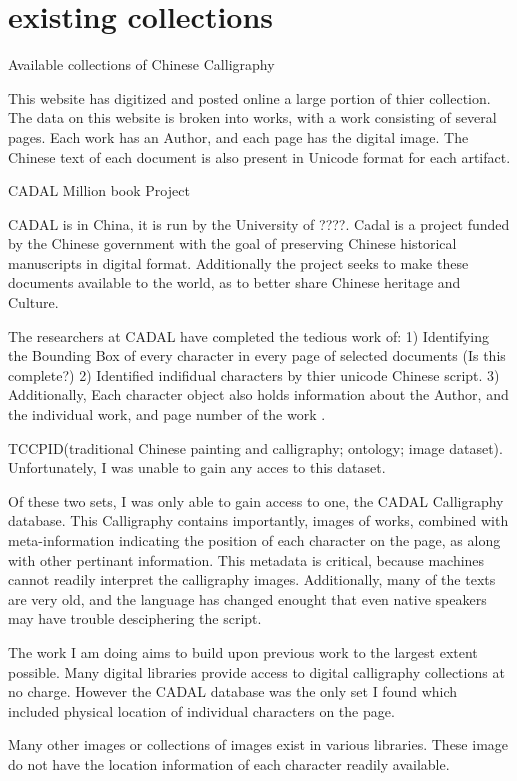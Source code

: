 
\chapter{existing collections}
Available collections of Chinese Calligraphy

This website has digitized and posted online a large portion of thier collection.  The data on this website is broken into works, with a work consisting of several pages.  Each work has an Author, and each page has the digital image.  The Chinese text of each document is also present in Unicode format for each artifact.


CADAL Million book Project

CADAL is in China, it is run by the University of ????.  Cadal is a project funded by the Chinese government with the goal of preserving Chinese historical manuscripts in digital format.  Additionally the project seeks to make these documents available to the world, as to better share Chinese heritage and Culture.

The researchers at CADAL have completed the tedious work of:
1) Identifying the Bounding Box of every character in every page of selected documents (Is this complete?)
2) Identified indifidual characters by thier unicode Chinese script.
3) Additionally, Each character object also holds information about the Author, and the individual work, and page number of the work .

TCCPID(traditional Chinese painting and calligraphy; ontology; image dataset)\cite{Bao_2010}.  Unfortunately, I was unable to gain any acces to this dataset.

    Of these two sets, I was only able to gain access to one, the CADAL Calligraphy database.  This Calligraphy contains importantly, images of works, combined with meta-information indicating the position of each character on the page, as along with other pertinant information.  This metadata is critical, because machines cannot readily interpret the calligraphy images.  Additionally, many of the texts are very old, and the language has changed enought that even native speakers may have trouble desciphering the script.

The work I am doing aims to build upon previous work to the largest extent possible.  Many digital libraries provide access to digital calligraphy collections at no charge.  However the CADAL database was the only set I found which included physical location of individual characters on the page.

   Many other images or collections of images exist in various libraries.  These image do not have the location information of each character readily available.

